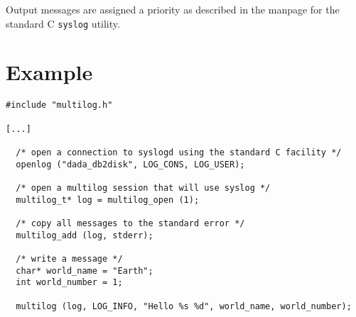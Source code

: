 Output messages are assigned a priority as described in the manpage
for the standard C {\tt syslog} utility.

\section{Example}

\begin{verbatim}
#include "multilog.h"

[...]

  /* open a connection to syslogd using the standard C facility */
  openlog ("dada_db2disk", LOG_CONS, LOG_USER);

  /* open a multilog session that will use syslog */
  multilog_t* log = multilog_open (1);

  /* copy all messages to the standard error */
  multilog_add (log, stderr);

  /* write a message */
  char* world_name = "Earth";
  int world_number = 1;

  multilog (log, LOG_INFO, "Hello %s %d", world_name, world_number);
\end{verbatim}
